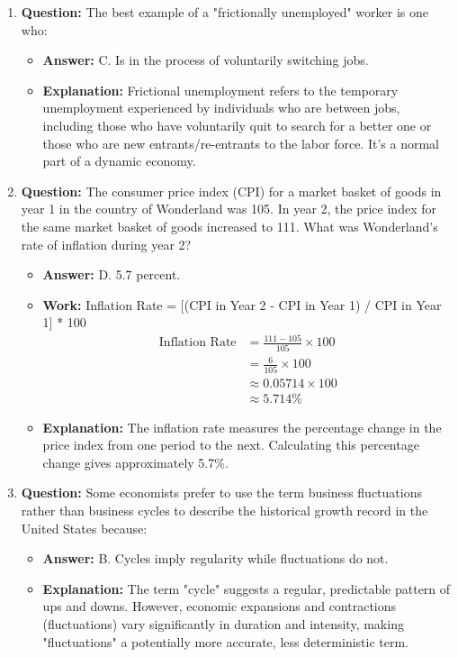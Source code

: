 \documentclass{article}
\begin{document}
\begin{enumerate}[label=\arabic*.]
  \item \textbf{Question:} The best example of a "frictionally unemployed" worker is one who:
    \begin{itemize}
      \item \textbf{Answer:} C. Is in the process of voluntarily switching jobs.
      \item \textbf{Explanation:} Frictional unemployment refers to the temporary unemployment experienced by individuals who are between jobs, including those who have voluntarily quit to search for a better one or those who are new entrants/re-entrants to the labor force. It's a normal part of a dynamic economy.
    \end{itemize}

  \item \textbf{Question:} The consumer price index (CPI) for a market basket of goods in year 1 in the country of Wonderland was 105. In year 2, the price index for the same market basket of goods increased to 111. What was Wonderland's rate of inflation during year 2?
    \begin{itemize}
      \item \textbf{Answer:} D. 5.7 percent.
      \item \textbf{Work:} Inflation Rate = [(CPI in Year 2 - CPI in Year 1) / CPI in Year 1] * 100
        \begin{align*}
          \text{Inflation Rate} &= \frac{111 - 105}{105} \times 100 \\
          &= \frac{6}{105} \times 100 \\
          &\approx 0.05714 \times 100 \\
          &\approx 5.714\%
        \end{align*}
      \item \textbf{Explanation:} The inflation rate measures the percentage change in the price index from one period to the next. Calculating this percentage change gives approximately 5.7\%.
    \end{itemize}

  \item \textbf{Question:} Some economists prefer to use the term business fluctuations rather than business cycles to describe the historical growth record in the United States because:
    \begin{itemize}
      \item \textbf{Answer:} B. Cycles imply regularity while fluctuations do not.
      \item \textbf{Explanation:} The term "cycle" suggests a regular, predictable pattern of ups and downs. However, economic expansions and contractions (fluctuations) vary significantly in duration and intensity, making "fluctuations" a potentially more accurate, less deterministic term.
    \end{itemize}


\end{enumerate}
\end{document}
